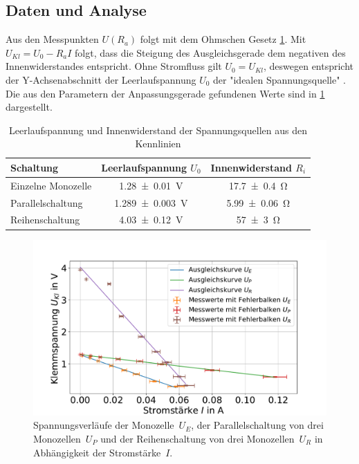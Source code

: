 \subsection{Daten und Analyse}


Aus den Messpunkten $U(R_a)$ folgt mit dem Ohmschen Gesetz \cref{fig:batt-ges-u}. Mit $U_{Kl}=U_0-R_a I$ folgt, dass die Steigung des Ausgleichsgerade dem negativen des Innenwiderstandes entspricht. Ohne Stromfluss gilt $U_0=U_{Kl}$, deswegen entspricht der Y-Achsenabschnitt der Leerlaufspannung $U_0$ der "idealen Spannungsquelle" \cite{lw}. Die aus den Parametern der Anpassungsgerade gefundenen Werte sind in \cref{tab:batt-U-R} dargestellt.





\begin{table}
	\caption{Leerlaufspannung und Innenwiderstand der Spannungsquellen aus den Kennlinien}
	\centering
	\begin{tabular}{|l||c|c|}
		\hline 
		Schaltung 	& Leerlaufspannung $U_0$ & Innenwiderstand $R_i$ \\ 
		\hline \hline
		Einzelne Monozelle	& \SI{1.28+-0.01}{V}  & \SI{17.7+-0.4}{\ohm } \\ 
		\hline  
		Parallelschaltung	& \SI{1.289+-0.003}{V } &\SI{5.99+-0.06}{\ohm }  \\ 
		\hline   
		Reihenschaltung	& \SI{4.03+-0.12}{V } &\SI{57+-3}{\ohm }  \\ 
		\hline 
	\end{tabular} 
	
	\label{tab:batt-U-R}
	
\end{table}


 


\begin{figure}[h]
	\centering
	\includegraphics[width=0.9\linewidth]{"auswertung/Auswertung Innenwiderstand/Batterie Gesamt U"}
	\caption{Spannungsverläufe der Monozelle~$U_E$, der Parallelschaltung von drei Monozellen~$U_P$ und der Reihenschaltung von drei Monozellen~$U_R$ in Abhängigkeit der Stromstärke~$I$.}
	\label{fig:batt-ges-u}
\end{figure}










